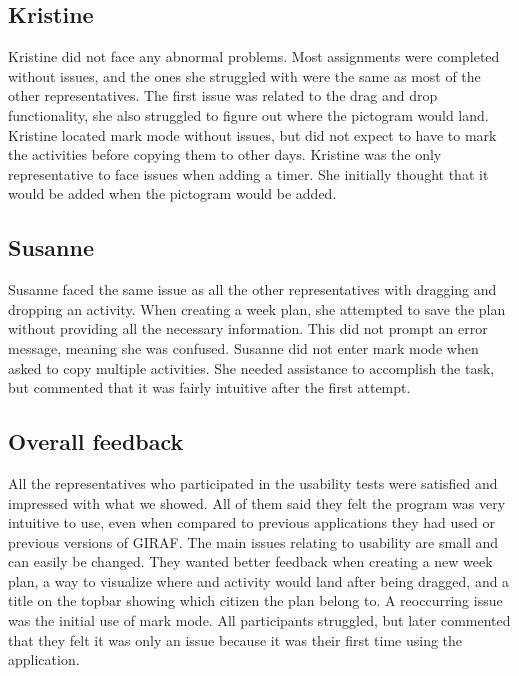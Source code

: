 \subsection{Kristine}
Kristine did not face any abnormal problems.
Most assignments were completed without issues, and the ones she struggled with were the same as most of the other representatives.
The first issue was related to the drag and drop functionality, she also struggled to figure out where the pictogram would land.
Kristine located mark mode without issues, but did not expect to have to mark the activities before copying them to other days. 
Kristine was the only representative to face issues when adding a timer. 
She initially thought that it would be added when the pictogram would be added.

\subsection{Susanne}
Susanne faced the same issue as all the other representatives with dragging and dropping an activity.
When creating a week plan, she attempted to save the plan without providing all the necessary information.
This did not prompt an error message, meaning she was confused.
Susanne did not enter mark mode when asked to copy multiple activities.
She needed assistance to accomplish the task, but commented that it was fairly intuitive after the first attempt.

\subsection{Overall feedback}
All the representatives who participated in the usability tests were satisfied and impressed with what we showed.
All of them said they felt the program was very intuitive to use, even when compared to previous applications they had used or previous versions of GIRAF.
The main issues relating to usability are small and can easily be changed.
They wanted better feedback when creating a new week plan, a way to visualize where and activity would land after being dragged, and a title on the topbar showing which citizen the plan belong to. 
A reoccurring issue was the initial use of mark mode.
All participants struggled, but later commented that they felt it was only an issue because it was their first time using the application.



